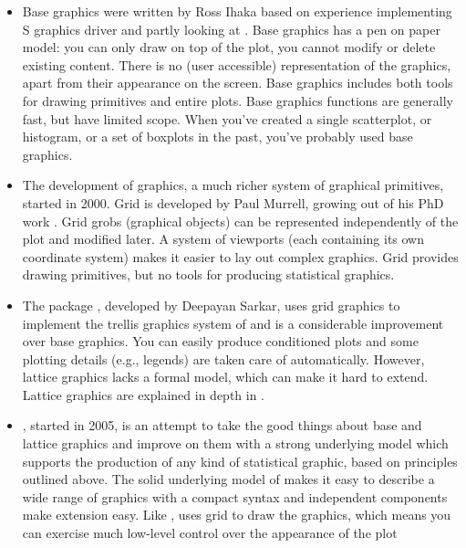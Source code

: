 \begin{itemize} 
  \item Base graphics were written by Ross Ihaka based on experience implementing S graphics driver and partly looking at \cite{chambers:1983}.  Base graphics has a pen on paper model: you can only draw on top of the plot, you cannot modify or delete existing content.  There is no (user accessible) representation of the graphics, apart from their appearance on the screen. Base graphics includes both tools for drawing primitives and entire plots.  Base graphics functions are generally fast, but have limited scope. When you've created a single scatterplot, or histogram, or a set of boxplots in the past, you've probably used base graphics.

  \item The development of  graphics, a much richer system of graphical primitives, started in 2000.  Grid is developed by Paul Murrell, growing out of his PhD work \citep{murrell:1998}. Grid grobs (graphical objects) can be represented independently of the plot and modified later. A system of viewports (each containing its own coordinate system) makes it easier to lay out complex graphics. Grid provides drawing primitives, but no tools for producing statistical graphics.  

  \item The  package \citep{lattice}, developed by Deepayan Sarkar, uses grid graphics to implement the trellis graphics system of \citet{cleveland:1993,cleveland:1994} and is a considerable improvement over base graphics.  You can easily produce conditioned plots and some plotting details (e.g., legends) are taken care of automatically.  However, lattice graphics lacks a formal model, which can make it hard to extend.  Lattice graphics are explained in depth in \citep{sarkar:2008}.

  \item \ggplot, started in 2005, is an attempt to take the good things about base and lattice graphics and improve on them with a strong underlying model which supports the production of any kind of statistical graphic, based on principles outlined above.  The solid underlying model of \ggplot makes it easy to describe a wide range of graphics with a compact syntax and independent components make extension easy.  Like , \ggplot uses grid to draw the graphics, which means you can exercise much low-level control over the appearance of the plot

\end{itemize}

